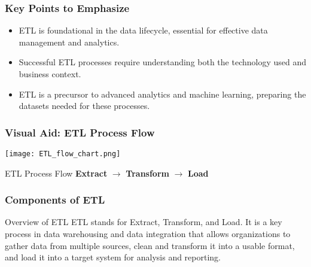 \documentclass[aspectratio=169]{beamer}
\begin{document}
\begin{frame}[fragile]
    \frametitle{Key Points to Emphasize}
    \begin{itemize}
        \item ETL is foundational in the data lifecycle, essential for effective data management and analytics.
        \item Successful ETL processes require understanding both the technology used and business context.
        \item ETL is a precursor to advanced analytics and machine learning, preparing the datasets needed for these processes.
    \end{itemize}
\end{frame}

\begin{frame}[fragile]
    \frametitle{Visual Aid: ETL Process Flow}
    \begin{center}
        \texttt{[image: ETL\_flow\_chart.png]} %
    \end{center}
    \begin{block}{ETL Process Flow}
        \textbf{Extract} $\rightarrow$ \textbf{Transform} $\rightarrow$ \textbf{Load}
    \end{block}
\end{frame}

\begin{frame}[fragile]
    \frametitle{Components of ETL}
    \begin{block}{Overview of ETL}
        ETL stands for Extract, Transform, and Load. It is a key process in data warehousing and data integration that allows organizations to gather data from multiple sources, clean and transform it into a usable format, and load it into a target system for analysis and reporting.
    \end{block}
\end{frame}
\end{document}
